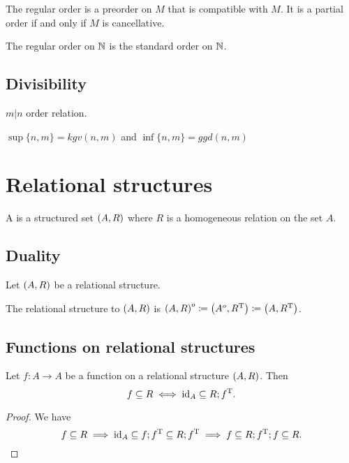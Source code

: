 \begin{lemma}
The regular order is a preorder on $M$ that is compatible with $M$. It is a partial order \textup{if and only if} $M$ is cancellative.
\end{lemma}

\begin{example}
The regular order on $\mathbb{N}$ is the standard order on $\mathbb{N}$.
\end{example}

\section{Divisibility}
$m|n$ order relation.

$\sup\{n,m\} = kgv(n,m)$ and $\inf\{n,m\} = ggd(n,m)$



\chapter{Relational structures}
\begin{definition}
A  is a structured set $\sSet{A, R}$ where $R$ is a homogeneous relation on the set $A$.
\end{definition}


\section{Duality}
\begin{definition}
Let $\sSet{A,R}$ be a relational structure.

The relational structure  to $\sSet{A,R}$ is $\sSet{A, R}^o \defeq \sSet{A^o,R^\transp}\defeq \sSet{A,R^\transp}$.
\end{definition}



\section{Functions on relational structures}

\begin{lemma} \label{functionSubsetRelation}
Let $f: A\to A$ be a function on a relational structure $\sSet{A,R}$. Then
\[ f \subseteq R \iff \operatorname{id}_A \subseteq R;f^{\mathrm{T}}. \]
\end{lemma}
\begin{proof}
We have
\[ f \subseteq R \implies \operatorname{id}_A \subseteq f;f^{\mathrm{T}} \subseteq R;f^{\mathrm{T}} \implies f \subseteq R;f^{\mathrm{T}};f \subseteq R. \]
\end{proof}

